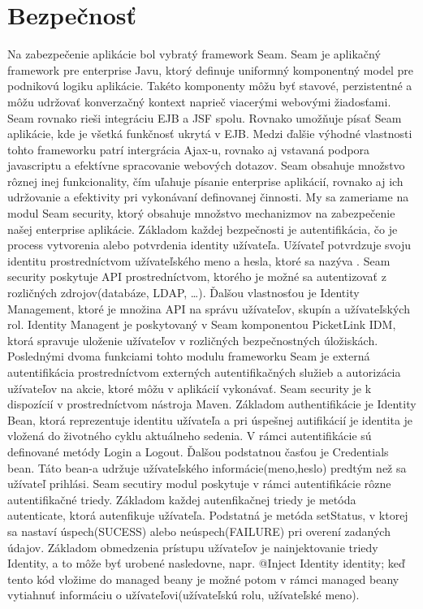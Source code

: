 \section{Bezpečnosť}
Na zabezpečenie aplikácie bol vybratý framework Seam. Seam je aplikačný framework pre enterprise Javu, ktorý definuje uniformný komponentný model pre podnikovú logiku aplikácie. Takéto komponenty môžu byť stavové, perzistentné a môžu udržovať konverzačný kontext naprieč viacerými webovými žiadosťami. Seam rovnako rieši integráciu EJB a JSF spolu. Rovnako umožňuje písať Seam aplikácie, kde je všetká funkčnosť ukrytá v EJB. Medzi ďalšie výhodné vlastnosti tohto frameworku patrí intergrácia Ajax-u, rovnako aj vstavaná podpora javascriptu a efektívne spracovanie webových dotazov. Seam obsahuje množstvo rôznej inej funkcionality, čím uľahuje písanie enterprise aplikácií, rovnako aj ich udržovanie a efektivity pri vykonávaní definovanej činnosti. My sa zameriame na modul Seam security, ktorý obsahuje množstvo mechanizmov na zabezpečenie našej enterprise aplikácie. Základom každej bezpečnosti je autentifikácia, čo je process vytvorenia alebo potvrdenia identity užívateľa. Užívateľ potvrdzuje svoju identitu prostredníctvom užívateľského meno a hesla, ktoré sa nazýva . Seam security poskytuje API prostredníctvom, ktorého je možné sa autentizovať z rozličných zdrojov(databáze, LDAP, \ldots). Ďalšou vlastnosťou je Identity Management, ktoré je množina API na správu užívateľov, skupín a užívateľských rol. Identity Managent je poskytovaný v Seam komponentou PicketLink IDM, ktorá spravuje uloženie užívateľov v rozličných bezpečnostných úložiskách. Poslednými dvoma funkciami tohto modulu frameworku Seam je externá autentifikácia prostredníctvom externých autentifikačných služieb a autorizácia užívateľov na akcie, ktoré môžu v aplikácií vykonávať. Seam security je k dispozícií v prostredníctvom nástroja Maven. Základom authentifikácie je Identity Bean, ktorá reprezentuje identitu užívateľa a pri úspešnej autifikácií je identita je vložená do životného cyklu aktuálneho sedenia. V rámci autentifikácie sú definované metódy Login a Logout. Ďalšou podstatnou časťou je Credentials bean. Táto bean-a udržuje užívateľského informácie(meno,heslo) predtým než sa užívateľ prihlási. Seam secutiry modul poskytuje v rámci autentifikácie rôzne autentifikačné triedy. Základom každej autenfikačnej triedy je metóda autenticate, ktorá autenfikuje užívateľa. Podstatná je metóda setStatus, v ktorej sa nastaví úspech(SUCESS) alebo neúspech(FAILURE) pri overení zadaných údajov. Základom obmedzenia prístupu užívateľov je nainjektovanie triedy Identity, a to môže byť urobené nasledovne, napr. @Inject Identity identity; keď tento kód vložime do managed beany je možné potom v rámci managed beany vytiahnuť informáciu o užívateľovi(užívateľskú rolu, užívateľské meno).
